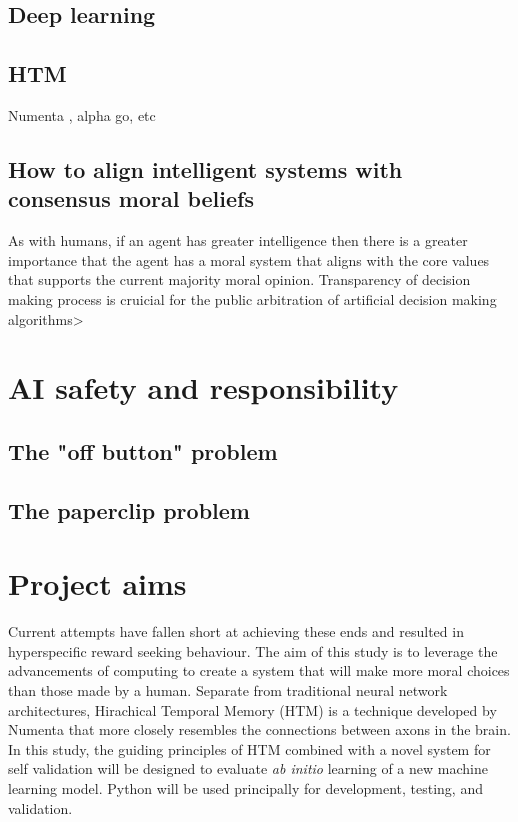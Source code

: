 \subsection{Deep learning}
\subsection{HTM}
Numenta \cite{numentahome}, alpha go, etc
\subsection{How to align intelligent systems with consensus moral beliefs}
As with humans, if an agent has greater intelligence then there is a greater importance that the agent has a moral system that aligns with the core values that supports the current majority moral opinion.
Transparency of decision making process is cruicial for the public arbitration of artificial decision making algorithms>

\section{AI safety and responsibility}
\subsection{The "off button" problem}
\subsection{The paperclip problem}

\section{Project aims}
Current attempts have fallen short at achieving these ends and resulted in hyperspecific reward seeking behaviour.
The aim of this study is to leverage the advancements of computing to create a system that will make more moral choices than those made by a human.
Separate from traditional neural network architectures, Hirachical Temporal Memory (HTM) is a technique developed by Numenta that more closely resembles the connections between axons in the brain.
In this study, the guiding principles of HTM combined with a novel system for self validation will be designed to evaluate \emph{ab initio} learning of a new machine learning model.
Python will be used principally for development, testing, and validation.

